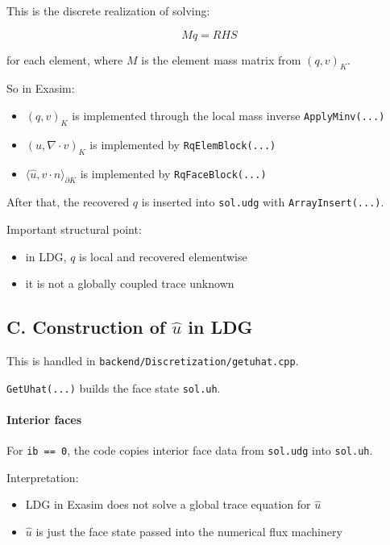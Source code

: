 \documentclass[11pt]{article}
\begin{document}
This is the discrete realization of solving:

\[
M q = RHS
\]

for each element, where $M$ is the element mass matrix from $(q, v)_K$.

So in Exasim:

\begin{itemize}[leftmargin=*]
\item $(q, v)_K$ is implemented through the local mass inverse
\texttt{ApplyMinv(...)}
\item $(u, \nabla \cdot v)_K$ is implemented by \texttt{RqElemBlock(...)}
\item $\langle \hat{u}, v \cdot n \rangle_{\partial K}$ is implemented by
\texttt{RqFaceBlock(...)}
\end{itemize}

After that, the recovered $q$ is inserted into \texttt{sol.udg} with
\texttt{ArrayInsert(...)}.

Important structural point:

\begin{itemize}[leftmargin=*]
\item in LDG, $q$ is local and recovered elementwise
\item it is not a globally coupled trace unknown
\end{itemize}

\subsection*{C. Construction of $\hat{u}$ in LDG}

This is handled in \texttt{backend/Discretization/getuhat.cpp}.

\texttt{GetUhat(...)} builds the face state \texttt{sol.uh}.

\paragraph{Interior faces}

For \texttt{ib == 0}, the code copies interior face data from
\texttt{sol.udg} into \texttt{sol.uh}.

Interpretation:

\begin{itemize}[leftmargin=*]
\item LDG in Exasim does not solve a global trace equation for $\hat{u}$
\item $\hat{u}$ is just the face state passed into the numerical flux machinery
\end{itemize}
\end{document}
